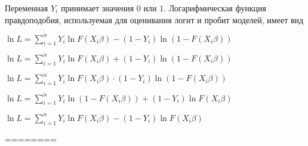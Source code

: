 
\begin{question}
Переменная \(Y_i\) принимает значения \(0\) или \(1\). Логарифмическая
функция правдоподобия, используемая для оценивания логит и пробит
моделей, имеет вид
\begin{answerlist}
  \item \(\ln L = \sum_{i=1}^n Y_i \ln F(X_i \beta) - (1 - Y_i) \ln (1 - F(X_i \beta))\)
  \item \(\ln L = \sum_{i=1}^n Y_i \ln F(X_i \beta) + (1 - Y_i) \ln (1 - F(X_i \beta))\)
  \item \(\ln L = \sum_{i=1}^n Y_i \ln F(X_i \beta) \cdot (1 - Y_i) \ln (1 - F(X_i \beta))\)
  \item \(\ln L = \sum_{i=1}^n Y_i \ln (1 - F(X_i \beta)) + (1 - Y_i) \ln F(X_i \beta)\)
  \item \(\ln L = \sum_{i=1}^n Y_i \ln F(X_i \beta) - (1 - Y_i) \ln F(X_i \beta)\)
\end{answerlist}
\end{question}

\begin{solution}
========
\end{solution}

